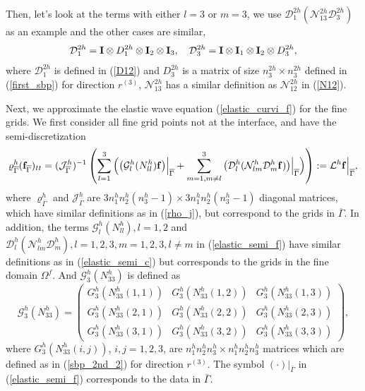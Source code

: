 Then, let's look at the terms with either $l = 3$ or $m = 3$, we use $\mathcal{D}_1^{2h}(\mathcal{N}_{13}^{2h}\mathcal{D}_3^{2h})$ as an example and the other cases are similar,
\begin{equation}\label{D13}
\mathcal{D}_1^{2h} = {\bf I}\otimes D_1^{2h} \otimes {\bf I}_2 \otimes {\bf I}_3,\ \ \ \mathcal{D}_3^{2h} ={\bf I}\otimes {\bf I}_1\otimes {\bf I}_2\otimes D_3^{2h},
\end{equation}
where $\mathcal{D}_1^{2h}$ is defined in (\ref{D12}) and $D_3^{2h}$ is a matrix of size $n_3^{2h}\times n_3^{2h}$ defined in (\ref{first_sbp}) for direction $r^{(3)}$, $\mathcal{N}_{13}^{2h}$ has a similar definition as $\mathcal{N}_{12}^{2h}$ in (\ref{N12}).

Next, we approximate the elastic wave equation (\ref{elastic_curvi_f}) for the fine grids. We first consider all fine grid points not at the interface, and have the semi-discretization
\begin{equation}\label{elastic_semi_f}
\varrho^h_{\overline{\Gamma}} ({\bf f}_{\overline{\Gamma}})_{tt} =
( \mathcal{ J}_{\overline{\Gamma}}^{h})^{-1}\left(\sum_{l=1}^3\Big(\big(\mathcal{G}_l^{h}({N}_{ll}^h){\bf f}\big)\Big|_{\overline{\Gamma}}+\sum_{m=1,m\neq l}^3\big(\mathcal{D}_l^{h}(\mathcal{N}_{lm}^{h}\mathcal{D}_m^{h}{\bf f})\big)\Big|_{\overline{\Gamma}}\Big)\right) := \mathcal{L}^h{\bf f}\Big|_{\overline{\Gamma}},
\end{equation}
where ${\varrho}^{h}_{\overline{\Gamma}}$ and ${\mathcal{J}}^{h}_{\overline{\Gamma}}$ are $3n_1^hn_2^h(n_3^h-1)\times 3n_1^hn_2^h(n_3^h-1)$ diagonal matrices, which have similar definitions as in (\ref{rho_j}), but correspond to the grids in $\overline{\Gamma}$. In addition, the terms $\mathcal{G}_l^h({N}_{ll}^h), l = 1,2$ and $\mathcal{D}_l^h(\mathcal{N}_{lm}^h\mathcal{D}_m^h), l=1,2,3,m=1,2,3,l\neq m$ in (\ref{elastic_semi_f}) have similar definitions as in (\ref{elastic_semi_c}) but corresponds to the grids in the fine domain $\Omega^f$. And $\mathcal{G}_3^h({N}_{33}^h)$ is defined as
\[ \mathcal{G}^{h}_3({N}_{33}^h) = \left(\begin{array}{ccc}
G_3^{h}(N_{33}^{h}(1,1)) & G_3^{h}(N_{33}^{h}(1,2))  & G_3^{h}(N_{33}^{h}(1,3)) \\
G_3^{h}(N_{33}^{h}(2,1)) & G_3^{h}(N_{33}^{h}(2,2))  & G_3^{h}(N_{33}^{h}(2,3)) \\
G_3^{h}(N_{33}^{h}(3,1)) & G_3^{h}(N_{33}^{h}(3,2))  & G_3^{h}(N_{33}^{h}(3,3)) \end{array}\right),\]
where ${G}_3^{h}(N_{33}^{h}(i,j))$, $i,j = 1,2,3$, are $n_1^{h}n_2^{h}n_3^{h}\times n_1^{h}n_2^{h}n_3^{h}$ matrices which are defined as in (\ref{sbp_2nd_2}) for direction $r^{(3)}$. The symbol $(\cdot)\big|_{\bar{\Gamma}}$ in (\ref{elastic_semi_f}) corresponds to the data in $\bar{\Gamma}$.

